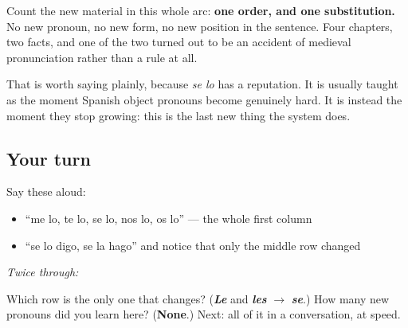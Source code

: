 \begin{grammarlens}[title={Grammar Lens: how little is actually new}]
Count the new material in this whole arc: \textbf{one order, and one substitution.} No new pronoun, no new form, no new position in the sentence. Four chapters, two facts, and one of the two turned out to be an accident of medieval pronunciation rather than a rule at all.

That is worth saying plainly, because \emph{se lo} has a reputation. It is usually taught as the moment Spanish object pronouns become genuinely hard. It is instead the moment they stop growing: this is the last new thing the system does.
\end{grammarlens}

\subsection*{Your turn}
Say these aloud:

\begin{itemize}
\raggedright
  \item \textquotedblleft{}me lo, te lo, se lo, nos lo, os lo\textquotedblright{} — the whole first column
  \item \textquotedblleft{}se lo digo, se la hago\textquotedblright{} and notice that only the middle row changed
\end{itemize}

\emph{Twice through:}

\begin{tcolorbox}[breakable,colback=teal!4,colframe=teal!35!black,title={Before you move on}]
Which row is the only one that changes? (\emph{\textbf{Le}} and \emph{\textbf{les}} $\to$ \emph{\textbf{se}}.) How many new pronouns did you learn here? (\textbf{None}.) Next: all of it in a conversation, at speed.
\end{tcolorbox}

